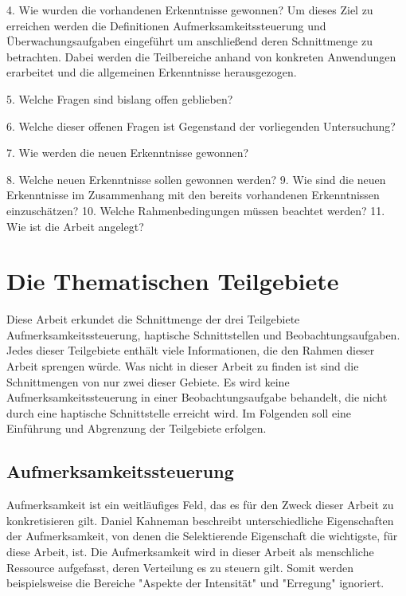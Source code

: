 \documentclass{llncs}					%
\begin{document}
4. Wie wurden die vorhandenen Erkenntnisse gewonnen?
Um dieses Ziel zu erreichen werden die Definitionen Aufmerksamkeitssteuerung und Überwachungsaufgaben eingeführt um anschließend deren Schnittmenge zu betrachten. Dabei werden die Teilbereiche anhand von konkreten Anwendungen erarbeitet und die allgemeinen Erkenntnisse herausgezogen.

5. Welche Fragen sind bislang offen geblieben?

6. Welche dieser offenen Fragen ist Gegenstand der vorliegenden Untersuchung?

7. Wie werden die neuen Erkenntnisse gewonnen?

8. Welche neuen Erkenntnisse sollen gewonnen werden?
9. Wie sind die neuen Erkenntnisse im Zusammenhang mit den bereits vorhandenen
Erkenntnissen einzuschätzen?
10. Welche Rahmenbedingungen müssen beachtet werden?
11. Wie ist die Arbeit angelegt?

\section{Die Thematischen Teilgebiete}
Diese Arbeit erkundet die Schnittmenge der drei Teilgebiete Aufmerksamkeitssteuerung, haptische Schnittstellen und Beobachtungsaufgaben. Jedes dieser Teilgebiete enthält viele Informationen, die den Rahmen dieser Arbeit sprengen würde. Was nicht in dieser Arbeit zu finden ist sind die Schnittmengen von nur zwei dieser Gebiete. Es wird keine Aufmerksamkeitssteuerung in einer Beobachtungsaufgabe behandelt, die nicht durch eine haptische Schnittstelle erreicht wird. Im Folgenden soll eine Einführung und Abgrenzung der Teilgebiete erfolgen.

\subsection{Aufmerksamkeitssteuerung}
Aufmerksamkeit ist ein weitläufiges Feld, das es für den Zweck dieser Arbeit zu konkretisieren gilt. Daniel Kahneman \cite{kahneman1973attention} beschreibt unterschiedliche Eigenschaften der Aufmerksamkeit, von denen die Selektierende Eigenschaft die wichtigste, für diese Arbeit, ist.
Die Aufmerksamkeit wird in dieser Arbeit als menschliche Ressource aufgefasst, deren Verteilung es zu steuern gilt. Somit werden beispielsweise die Bereiche "Aspekte der Intensität"\cite{kahneman1973attention} und "Erregung"\cite{kahneman1973attention} ignoriert.
\end{document}
